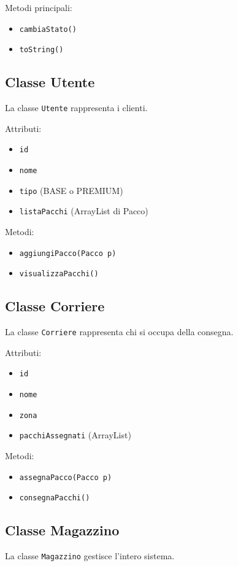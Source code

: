 \documentclass[a4paper,12pt]{article}
\begin{document}
Metodi principali:
\begin{itemize}
    \item \texttt{cambiaStato()}
    \item \texttt{toString()}
\end{itemize}

\subsection{Classe Utente}
La classe \texttt{Utente} rappresenta i clienti.

Attributi:
\begin{itemize}
    \item \texttt{id}
    \item \texttt{nome}
    \item \texttt{tipo} (BASE o PREMIUM)
    \item \texttt{listaPacchi} (ArrayList di Pacco)
\end{itemize}

Metodi:
\begin{itemize}
    \item \texttt{aggiungiPacco(Pacco p)}
    \item \texttt{visualizzaPacchi()}
\end{itemize}

\subsection{Classe Corriere}
La classe \texttt{Corriere} rappresenta chi si occupa della consegna.

Attributi:
\begin{itemize}
    \item \texttt{id}
    \item \texttt{nome}
    \item \texttt{zona}
    \item \texttt{pacchiAssegnati} (ArrayList)
\end{itemize}

Metodi:
\begin{itemize}
    \item \texttt{assegnaPacco(Pacco p)}
    \item \texttt{consegnaPacchi()}
\end{itemize}

\subsection{Classe Magazzino}
La classe \texttt{Magazzino} gestisce l'intero sistema.
\end{document}
